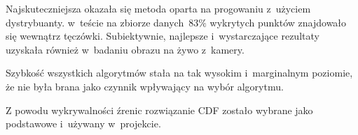 Najskuteczniejsza okazała się metoda oparta na progowaniu z~użyciem dystrybuanty. w~teście na zbiorze danych~$83\%$ wykrytych punktów znajdowało się wewnątrz tęczówki. Subiektywnie, najlepsze i~wystarczające rezultaty uzyskała również w~badaniu obrazu na żywo z~kamery.

\par

Szybkość wszystkich algorytmów stała na tak wysokim i~marginalnym poziomie, że nie była brana jako czynnik wpływający na wybór algorytmu.

\par

Z powodu wykrywalności źrenic rozwiązanie CDF zostało wybrane jako podstawowe i~używany w~projekcie.